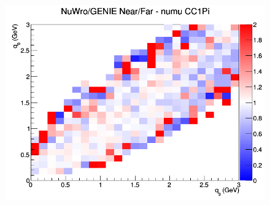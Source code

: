 \documentclass[12pt]{article}
\begin{document}
\begin{figure}[h]
\endminipage
{}
\includegraphics[width=\linewidth]{eff_q0_q3/LAr/ratios/CC1Pi_NuWro_GENIE_numu_NF_q3_q0.png}
\endminipage
\newline
\end{figure}
\clearpage
\end{document}

